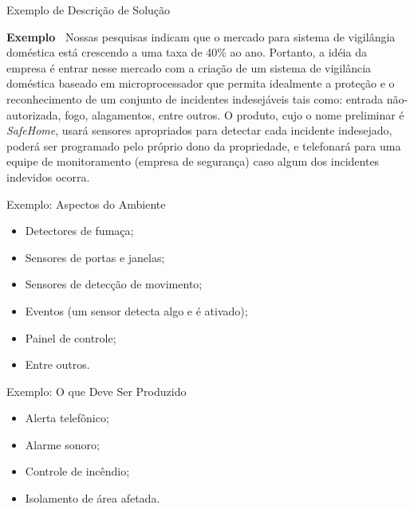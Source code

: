 \documentclass[xcolor=x11names,compress]{beamer}
\begin{document}
\begin{frame}{Exemplo de Descrição de Solução}

\begin{alertblock}{\textbf {Exemplo~\cite{Pressman-2001}}}
Nossas pesquisas indicam que o mercado para sistema de vigilângia doméstica está crescendo a uma taxa de 40\% ao ano. Portanto, a idéia da empresa é entrar nesse mercado com a criação de um sistema de vigilância doméstica baseado em microprocessador que permita idealmente a proteção e o reconhecimento de um conjunto de incidentes indesejáveis tais como: entrada não-autorizada, fogo, alagamentos, entre outros. O produto, cujo o nome preliminar é \textit{SafeHome}, usará sensores apropriados para detectar cada incidente indesejado, poderá ser programado pelo próprio dono da propriedade, e telefonará para uma equipe de monitoramento (empresa de segurança) caso algum dos incidentes indevidos ocorra.
\end{alertblock}
\end{frame}

\begin{frame}{Exemplo:  Aspectos do Ambiente}

\begin{itemize}
\itemsep 5mm

\item Detectores de fumaça;

\item Sensores de portas e janelas;

\item Sensores de detecção de movimento;

\item Eventos (um sensor detecta algo e é ativado);

\item Painel de controle;

\item Entre outros.

\end{itemize}

\end{frame}

\begin{frame}{Exemplo: O que Deve Ser Produzido}

\begin{itemize}
\itemsep 5mm

\item Alerta telefônico;

\item Alarme sonoro;

\item Controle de incêndio;

\item Isolamento de área afetada.

\end{itemize}

\end{frame}
\end{document}
